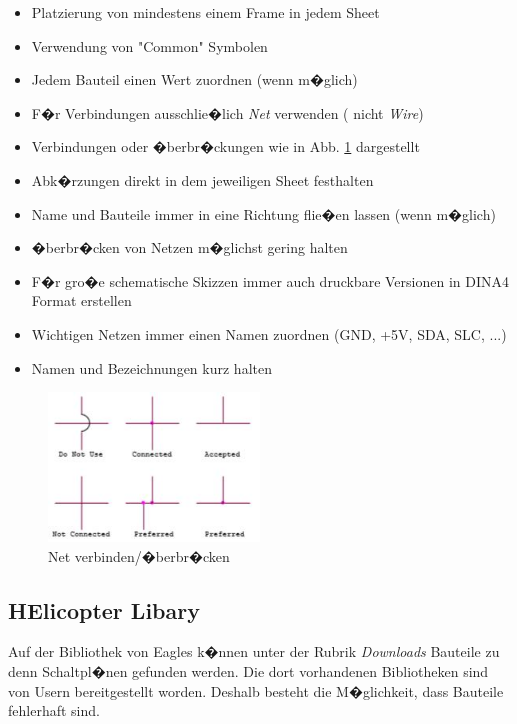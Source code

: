 \begin{itemize}
	\item Platzierung von mindestens einem Frame in jedem Sheet
	\item Verwendung von "Common" Symbolen
	\item Jedem Bauteil einen Wert zuordnen (wenn m�glich)
	\item F�r Verbindungen ausschlie�lich \textit{Net} verwenden ( nicht \textit{Wire})
	\item Verbindungen oder �berbr�ckungen wie in Abb. \ref{CrossingConnection} dargestellt
	\item Abk�rzungen direkt in dem jeweiligen Sheet festhalten
	\item Name und Bauteile immer in eine Richtung flie�en lassen (wenn m�glich)
	\item �berbr�cken von Netzen m�glichst gering halten
	\item F�r gro�e schematische Skizzen immer auch druckbare Versionen in DINA4 Format erstellen
	\item Wichtigen Netzen immer einen Namen zuordnen (GND, +5V, SDA, SLC, ...)
	\item Namen und Bezeichnungen kurz halten
\end{itemize}

\begin{figure}[H]
	\centering
	\includegraphics[width=0.5\textwidth]{fig/Schematic/CrossingConnection.jpg}
	\caption[Net verbinden/�berbr�cken]{Net verbinden/�berbr�cken\protect\footnotemark}
	\label{CrossingConnection}
\end{figure}


\newpage
\subsection{HElicopter Libary}
Auf der Bibliothek von Eagles k�nnen unter der Rubrik \emph{Downloads} Bauteile zu denn Schaltpl�nen gefunden werden. Die dort vorhandenen Bibliotheken sind von Usern bereitgestellt worden. Deshalb besteht die M�glichkeit, dass Bauteile fehlerhaft sind.

